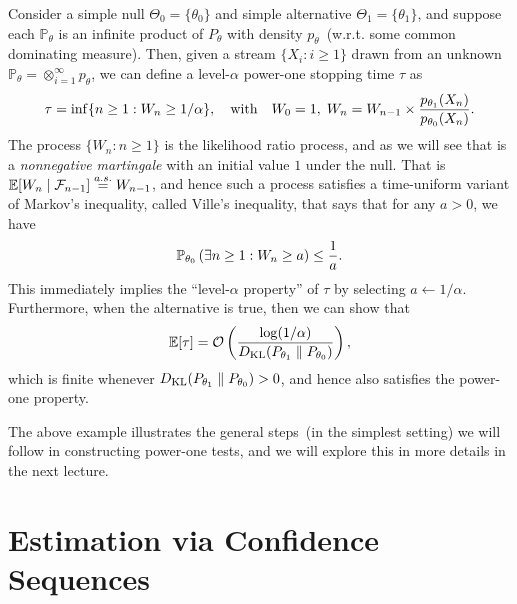 \documentclass[12pt]{article}
\begin{document}
\begin{example}
    \label{example:power-one-test-1} Consider a simple null $\Theta_0 = \{\theta_0\}$ and simple alternative $\Theta_1 = \{\theta_1\}$, and suppose each $\mathbb{P}_\theta$ is an infinite product of $P_\theta$ with density $p_\theta$~(w.r.t. some common dominating measure). Then, given a stream $\{X_i: i \geq 1\}$ drawn from an unknown $\mathbb{P}_\theta = \otimes_{i=1}^\infty p_\theta$, we can define a level-$\alpha$ power-one stopping time $\tau$ as 
    \begin{align}
        \tau = \inf \{n \geq 1: W_n \geq 1/\alpha\}, \quad \text{with} \quad W_0=1, \; W_n = W_{n-1} \times \frac{p_{\theta_1}(X_n)}{p_{\theta_0}(X_n)}. 
    \end{align}
    The process $\{W_n: n \geq 1\}$ is the likelihood ratio process, and as we will see that is a \emph{nonnegative martingale} with an initial value $1$ under the null. That is $\mathbb{E}[W_n \mid {\cal F}_{n-1}] \stackrel{a.s.}{=} W_{n-1}$, and hence such a process satisfies a time-uniform variant of Markov's inequality, called Ville's inequality, that says that for any $a >0$, we have 
    \begin{align}
        \mathbb{P}_{\theta_0} \left( \exists n \geq  1: W_n \geq a \right) \leq \frac{1}{a}. 
    \end{align}
    This immediately implies the ``level-$\alpha$ property'' of $\tau$ by selecting $a \leftarrow 1/\alpha$. Furthermore, when the alternative is true, then we can show that 
    \begin{align}
        \mathbb{E}[\tau] = {\cal O}\left( \frac{\log (1/\alpha)}{D_{\text{KL}}(P_{\theta_1} \parallel P_{\theta_0}) } \right), 
    \end{align}
    which is finite whenever $D_{\text{KL}}(P_{\theta_1} \parallel P_{\theta_0})>0$, and hence also satisfies the power-one property.
\end{example}

The above example illustrates the general steps~(in the simplest setting) we will follow in constructing power-one tests, and we will explore this in more details in the next lecture. 

\section{Estimation via Confidence Sequences}
\label{sec:confidence-sequences}
\end{document}
